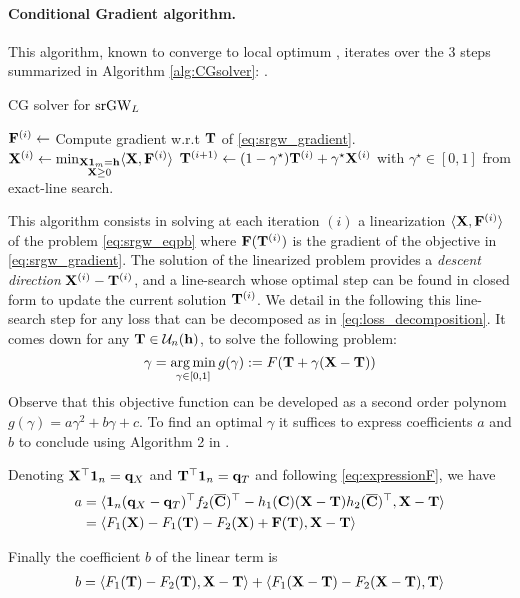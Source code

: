 \paragraph{Conditional Gradient algorithm.} This algorithm, known to converge to local optimum \cite{lacoste2016convergence}, iterates over the 3 steps summarized in Algorithm \ref{alg:CGsolver}:
.\begin{algorithm}[H]
\caption{CG solver for $\operatorname{srGW}_L$\label{alg:CGsolver}}
\begin{algorithmic}[1]
	\REPEAT
	\STATE ${\mathbf{F}}^{(i)}\leftarrow $  Compute gradient  w.r.t ${\mathbf{T}}$ of \eqref{eq:srgw_gradient}.
	\STATE ${\mathbf{X}}^{(i)}\leftarrow \min_{\substack{{\mathbf{X}}\bm{1}_m ={\mathbf{h}}\\ {\mathbf{X}} \geq 0}} \langle {\mathbf{X}} , {\mathbf{F}}^{(i)} \rangle $%
	\STATE ${\mathbf{T}}^{(i+1)} \leftarrow (1-\gamma^\star){\mathbf{T}}^{(i)} + \gamma^\star {\mathbf{X}}^{(i)}$   with $\gamma^\star \in [0,1]$ from exact-line search.
\end{algorithmic}
\end{algorithm}

This algorithm consists in solving at each
iteration $(i)$ a linearization $\langle {\mathbf{X}} , {\mathbf{F}}^{(i)} \rangle$ of the problem \eqref{eq:srgw_eqpb}
where ${\mathbf{F}}({\mathbf{T}}^{(i)})$ is the gradient of the objective in \eqref{eq:srgw_gradient}.  The solution of the linearized problem provides a \emph{descent direction} ${\mathbf{X}}^{(i) }-{\mathbf{T}}^{(i)}$, and a line-search whose optimal step can be found in closed form to
update the current solution ${\mathbf{T}}^{(i)}$. We detail in the following this line-search step for any loss that can be decomposed as in \eqref{eq:loss_decomposition}. It comes down for any ${\mathbf{T}} \in \mathcal{U}_n({\mathbf{h}})$, to solve the following problem:
\begin{equation}
\gamma = \operatorname*{arg\,min}_{\gamma \in [0,1]} g(\gamma) := F({\mathbf{T}} + \gamma ({\mathbf{X}} - {\mathbf{T}}))
\end{equation}
Observe that this objective function can be developed as a second order polynom $g(\gamma) = a \gamma^2 + b \gamma +c$. To find an optimal $\gamma$ it suffices to express coefficients $a$ and $b$ to conclude using Algorithm 2 in \cite{vayer2018optimal}.


Denoting ${\mathbf{X}}^\top \bm{1}_n = {\mathbf{q}}_X$ and ${\mathbf{T}}^\top \bm{1}_n = {\mathbf{q}}_T$ and following \eqref{eq:expressionF}, we have
\begin{equation}
\begin{split}
	a &= \langle  \bm{1}_{n} ({\mathbf{q}}_X - {\mathbf{q}}_T)^\top f_2(\overline{{\mathbf{C}}})^\top - h_1({\mathbf{C}}) ({\mathbf{X}}- {\mathbf{T}}) h_2(\overline{{\mathbf{C}}})^\top , {\mathbf{X}} - {\mathbf{T}} \rangle \\
	&= \langle F_1({\mathbf{X}}) - F_1({\mathbf{T}}) - F_2({\mathbf{X}}) + {\mathbf{F}}({\mathbf{T}}) , {\mathbf{X}} - {\mathbf{T}} \rangle 
\end{split}
\end{equation}

Finally the coefficient $b$ of the linear term is
\begin{equation}
\begin{split}
	b &=  \langle  F_1({\mathbf{T}}) - F_2({\mathbf{T}}) , {\mathbf{X}}-{\mathbf{T}} \rangle + \langle  F_1({\mathbf{X}} - {\mathbf{T}}) - F_2({\mathbf{X}}- {\mathbf{T}}), {\mathbf{T}}  \rangle \\
\end{split}
\end{equation}

